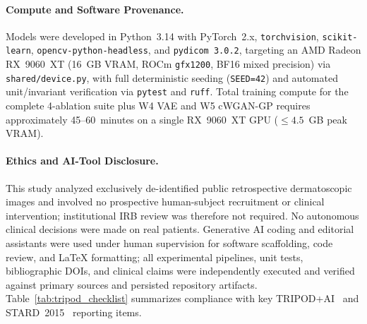 \paragraph{Compute and Software Provenance.}
Models were developed in Python~3.14 with PyTorch~2.x, \texttt{torchvision}, \texttt{scikit-learn}, \texttt{opencv-python-headless}, and \texttt{pydicom~3.0.2}, targeting an AMD Radeon RX~9060~XT (16~GB VRAM, ROCm \texttt{gfx1200}, BF16 mixed precision) via \texttt{shared/device.py}, with full deterministic seeding (\texttt{SEED=42}) and automated unit/invariant verification via \texttt{pytest} and \texttt{ruff}. Total training compute for the complete 4-ablation suite plus W4 VAE and W5 cWGAN-GP requires approximately 45--60~minutes on a single RX~9060~XT GPU ($\le 4.5$~GB peak VRAM).

\paragraph{Ethics and AI-Tool Disclosure.}
This study analyzed exclusively de-identified public retrospective dermatoscopic images and involved no prospective human-subject recruitment or clinical intervention; institutional IRB review was therefore not required. No autonomous clinical decisions were made on real patients. Generative AI coding and editorial assistants were used under human supervision for software scaffolding, code review, and LaTeX formatting; all experimental pipelines, unit tests, bibliographic DOIs, and clinical claims were independently executed and verified against primary sources and persisted repository artifacts. Table~\ref{tab:tripod_checklist} summarizes compliance with key TRIPOD+AI~\cite{Collins2024tripod} and STARD~2015~\cite{Bossuyt2015stard} reporting items.

